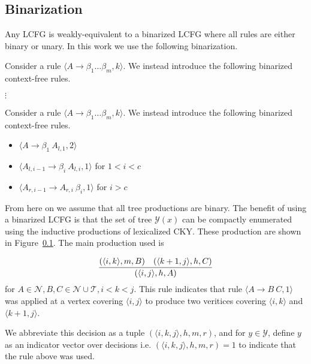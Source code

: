 \documentclass[11pt,letterpaper]{article}
\newcommand{\nonterms}{\mathcal{N}}
\newcommand{\terms}{\mathcal{T}}
\newcommand{\Span}[1]{\langle #1 \rangle}
\begin{document}
\subsection{Binarization}

Any LCFG is weakly-equivalent to a binarized LCFG where all rules are either binary or unary. In this work we use the following binarization.

Consider a rule $\langle A \rightarrow \beta_1 \ldots \beta_m, k\rangle$. We instead introduce the following binarized context-free rules.

$\vdots$

Consider a rule $\langle A \rightarrow \beta_1 \ldots \beta_m, k\rangle$. We instead introduce the following binarized context-free rules.



\begin{itemize}
\item $\langle A  \rightarrow \beta_1\ A_{l, 1}, 2 \rangle $

\item
$\langle A_{l, i-1}  \rightarrow \beta_i\ A_{l, i}, 1 \rangle $ for $1< i < c$
\item
$\langle A_{r, i-1}  \rightarrow  A_{r, i} \ \beta_i, 1 \rangle $ for $i > c$


\end{itemize}


From here on we assume that all tree productions are binary. The benefit of using a binarized LCFG is that the set of tree $\mathcal{Y}(x)$ can be compactly enumerated using the inductive productions of lexicalized CKY. These production are shown in Figure~\ref{}. The main production used is

\[ \infer{(\Span{i, j}, h, A)}{(\Span{i, k}, m, B) &  (\Span{k+1, j}, h, C)} \]
 for $A \in \nonterms, B, C \in \nonterms \cup \terms, i < k < j$. This rule indicates that rule $\langle A \rightarrow B\ C, 1\rangle$  was applied at a vertex covering $\Span{i, j}$ to produce two veritices covering $\Span{i, k}$ and $\Span{k+1, j}$.



We abbreviate this decision as a tuple $(\Span{i ,k, j}, h, m, r)$, and for $y \in \mathcal{Y}$, define  $y$ as an indicator vector over decisions i.e.  $(\Span{i ,k, j}, h, m, r) = 1$ to indicate that the rule above was used.
\end{document}
